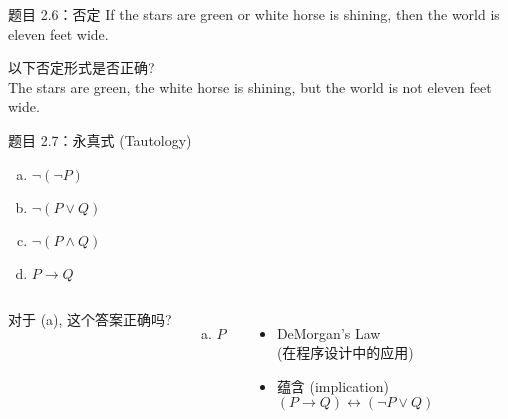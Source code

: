\begin{frame}{}
  \begin{exampleblock}{题目 2.6：否定}
    If the stars are green or white horse is shining,
    then the world is eleven feet wide.
  \end{exampleblock}

  \vspace{0.50cm}

  以下否定形式是否正确?\\[8pt]

  The stars are green, the white horse is shining, but the world is not eleven feet wide.
\end{frame}

\begin{frame}{}
  \begin{exampleblock}{题目 2.7：永真式 (Tautology)}
    \begin{enumerate}[(a)]
      \item $\lnot(\lnot P)$
      \item $\lnot(P \lor Q)$
      \item $\lnot(P \land Q)$
      \item $P \to Q$
    \end{enumerate}
  \end{exampleblock}

  \vspace{0.30cm}
  \begin{columns}
      对于 (a), 这个答案正确吗?
      \begin{enumerate}[(a)]
	\item $P$
      \end{enumerate}
    \pause
      \begin{itemize}
	\item DeMorgan's Law \\
	  (在程序设计中的应用)
	\item 蕴含 (implication)
	  \[
	    (P \to Q) \leftrightarrow (\lnot P \lor Q)
	  \]
      \end{itemize}
  \end{columns}

\end{frame}

